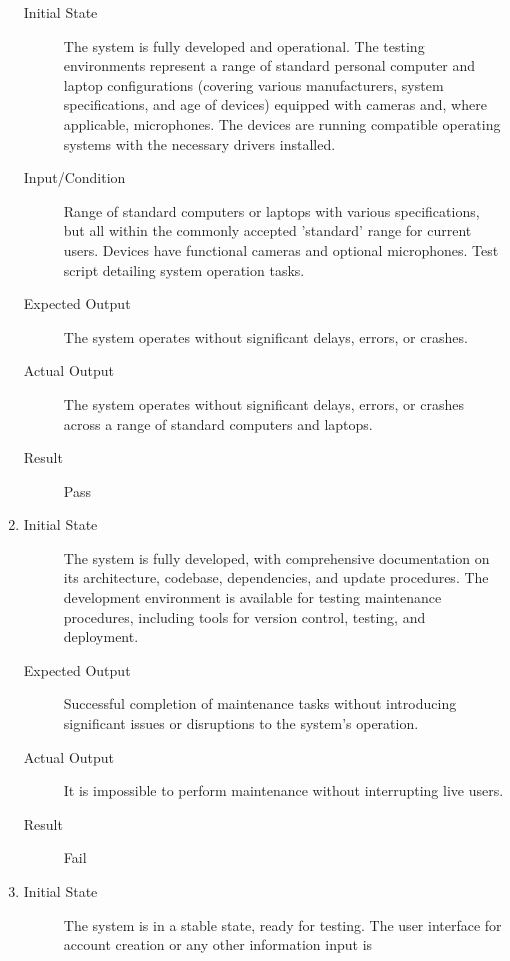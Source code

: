 \documentclass[12pt, titlepage]{article}
\begin{document}
\begin{enumerate}[NFR-T1]
    \begin{description}
    \item[Initial State] The system is fully developed and operational. The testing
      environments represent a range of standard personal computer and laptop
      configurations (covering various manufacturers, system specifications, and
      age of devices) equipped with cameras and, where applicable, microphones.
      The devices are running compatible operating systems with the necessary
      drivers installed.
    \item[Input/Condition] Range of standard computers or laptops with various
      specifications, but all within the commonly accepted 'standard' range for
      current users. Devices have functional cameras and optional microphones.
      Test script detailing system operation tasks.
    \item[Expected Output] The system operates without significant delays, errors,
      or crashes.
    \item[Actual Output] The system operates without significant delays, errors, or
      crashes across a range of standard computers and laptops.
    \item[Result] Pass
    \end{description}
  \item \label{NFRT19}
    \begin{description}
    \item[Initial State] The system is fully developed, with comprehensive
      documentation on its architecture, codebase, dependencies, and update
      procedures. The development environment is available for testing
      maintenance procedures, including tools for version control, testing, and
      deployment.
    \item[Expected Output] Successful completion of maintenance tasks without
      introducing significant issues or disruptions to the system's operation.
    \item[Actual Output] It is impossible to perform maintenance without
      interrupting live users.
    \item[Result] Fail
    \end{description}
  \addtocounter{enumi}{2}
  \item \label{NFRT22}
    \begin{description}
    \item[Initial State] The system is in a stable state, ready for testing. The
      user interface for account creation or any other information input is

\end{description}
\end{enumerate}
\end{document}
